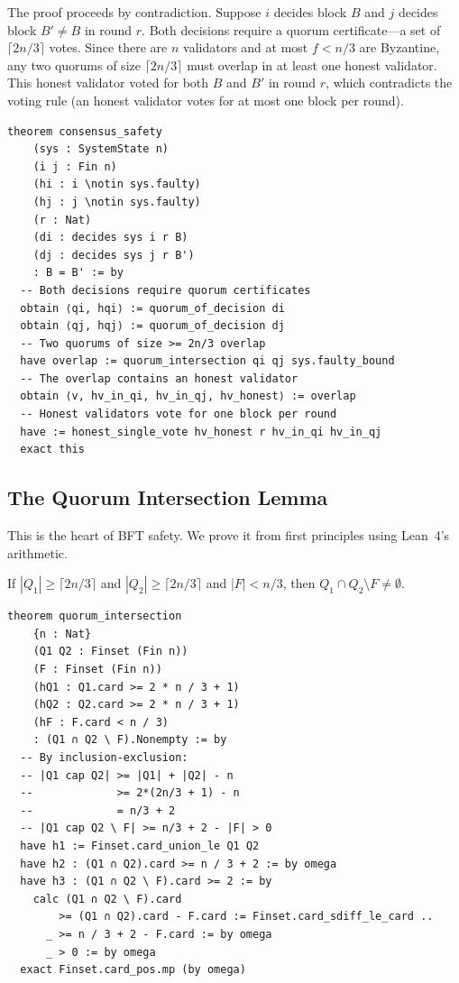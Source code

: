 The proof proceeds by contradiction. Suppose $i$ decides block $B$ and $j$ decides block
$B' \neq B$ in round $r$. Both decisions require a quorum certificate---a set of
$\lceil 2n/3 \rceil$ votes. Since there are $n$ validators and at most $f < n/3$ are
Byzantine, any two quorums of size $\lceil 2n/3 \rceil$ must overlap in at least one
honest validator. This honest validator voted for both $B$ and $B'$ in round $r$, which
contradicts the voting rule (an honest validator votes for at most one block per round).

\begin{lstlisting}[language=Lean,caption={Safety proof sketch in Lean~4}]
theorem consensus_safety
    (sys : SystemState n)
    (i j : Fin n)
    (hi : i \notin sys.faulty)
    (hj : j \notin sys.faulty)
    (r : Nat)
    (di : decides sys i r B)
    (dj : decides sys j r B')
    : B = B' := by
  -- Both decisions require quorum certificates
  obtain ⟨qi, hqi⟩ := quorum_of_decision di
  obtain ⟨qj, hqj⟩ := quorum_of_decision dj
  -- Two quorums of size >= 2n/3 overlap
  have overlap := quorum_intersection qi qj sys.faulty_bound
  -- The overlap contains an honest validator
  obtain ⟨v, hv_in_qi, hv_in_qj, hv_honest⟩ := overlap
  -- Honest validators vote for one block per round
  have := honest_single_vote hv_honest r hv_in_qi hv_in_qj
  exact this
\end{lstlisting}

\subsection{The Quorum Intersection Lemma}

This is the heart of BFT safety. We prove it from first principles using Lean~4's
arithmetic.

\begin{lemma}
If $|Q_1| \geq \lceil 2n/3 \rceil$ and $|Q_2| \geq \lceil 2n/3 \rceil$ and $|F| < n/3$,
then $Q_1 \cap Q_2 \setminus F \neq \emptyset$.
\end{lemma}

\begin{lstlisting}[language=Lean,caption={Quorum intersection proof}]
theorem quorum_intersection
    {n : Nat}
    (Q1 Q2 : Finset (Fin n))
    (F : Finset (Fin n))
    (hQ1 : Q1.card >= 2 * n / 3 + 1)
    (hQ2 : Q2.card >= 2 * n / 3 + 1)
    (hF : F.card < n / 3)
    : (Q1 ∩ Q2 \ F).Nonempty := by
  -- By inclusion-exclusion:
  -- |Q1 cap Q2| >= |Q1| + |Q2| - n
  --             >= 2*(2n/3 + 1) - n
  --             = n/3 + 2
  -- |Q1 cap Q2 \ F| >= n/3 + 2 - |F| > 0
  have h1 := Finset.card_union_le Q1 Q2
  have h2 : (Q1 ∩ Q2).card >= n / 3 + 2 := by omega
  have h3 : (Q1 ∩ Q2 \ F).card >= 2 := by
    calc (Q1 ∩ Q2 \ F).card
        >= (Q1 ∩ Q2).card - F.card := Finset.card_sdiff_le_card ..
      _ >= n / 3 + 2 - F.card := by omega
      _ > 0 := by omega
  exact Finset.card_pos.mp (by omega)
\end{lstlisting}

